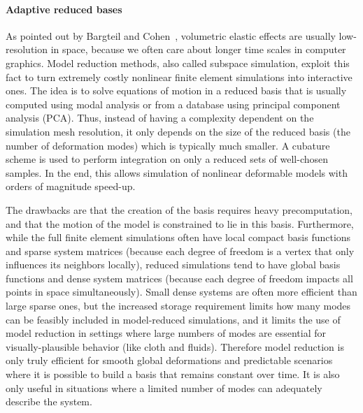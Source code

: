 \paragraph*{Adaptive reduced bases}
As pointed out by Bargteil and Cohen~\cite{bargteil2014animation}, volumetric elastic effects are usually low-resolution in space, because we often care about longer time scales in computer graphics.
Model reduction methods, also called subspace simulation, exploit this fact to turn extremely costly nonlinear finite element simulations into interactive ones.
The idea is to solve equations of motion in a reduced basis that is usually computed using modal analysis or from a database using principal component analysis (PCA).
Thus, instead of having a complexity dependent on the simulation mesh resolution, it only depends on the size of the reduced basis (the number of deformation modes) which is typically much smaller.
A cubature scheme is used to perform integration on only a reduced sets of well-chosen samples. In the end, this allows simulation of nonlinear deformable models with orders of magnitude speed-up.

The drawbacks are that the creation of the basis requires heavy precomputation, and that the motion of the model is constrained to lie in this basis. Furthermore, while the full finite element simulations often have local compact basis functions and sparse system matrices (because each degree of freedom is a vertex that only influences its neighbors locally), reduced simulations tend to have global basis functions and dense system matrices (because each degree of freedom impacts all points in space simultaneously). Small dense systems are often more efficient than large sparse ones, but the increased storage requirement limits how many modes can be feasibly included in model-reduced simulations, and it limits the use of model reduction in settings where large numbers of modes are essential for visually-plausible behavior (like cloth and fluids).
Therefore model reduction is only truly efficient for smooth global deformations and predictable scenarios where it is possible to build a basis that remains constant over time. It is also only useful in situations where a limited number of modes can adequately describe the system.

